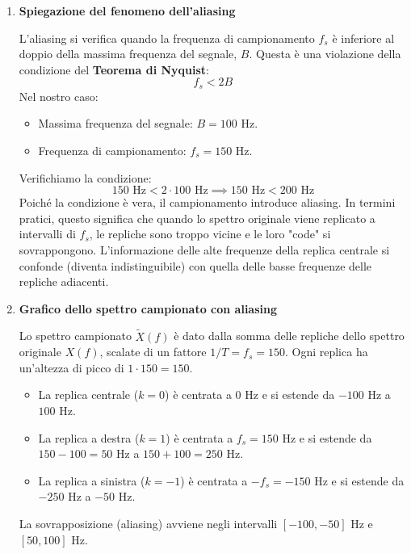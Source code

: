 
\begin{soluzione}{6}
    \begin{enumerate}
        \item \textbf{Spiegazione del fenomeno dell'aliasing}
        
        L'aliasing si verifica quando la frequenza di campionamento $f_s$ è inferiore al doppio della massima frequenza del segnale, $B$. Questa è una violazione della condizione del \textbf{Teorema di Nyquist}:
        \[
            f_s < 2B
        \]
        Nel nostro caso:
        \begin{itemize}
            \item Massima frequenza del segnale: $B = 100$ Hz.
            \item Frequenza di campionamento: $f_s = 150$ Hz.
        \end{itemize}
        Verifichiamo la condizione:
        \[
            150 \text{ Hz} < 2 \cdot 100 \text{ Hz} \implies 150 \text{ Hz} < 200 \text{ Hz}
        \]
        Poiché la condizione è vera, il campionamento introduce aliasing. In termini pratici, questo significa che quando lo spettro originale viene replicato a intervalli di $f_s$, le repliche sono troppo vicine e le loro "code" si sovrappongono. L'informazione delle alte frequenze della replica centrale si confonde (diventa indistinguibile) con quella delle basse frequenze delle repliche adiacenti.

        \item \textbf{Grafico dello spettro campionato con aliasing}

        Lo spettro campionato $\tilde{X}(f)$ è dato dalla somma delle repliche dello spettro originale $X(f)$, scalate di un fattore $1/T = f_s = 150$. Ogni replica ha un'altezza di picco di $1 \cdot 150 = 150$.
        \begin{itemize}
            \item La replica centrale ($k=0$) è centrata a $0$ Hz e si estende da $-100$ Hz a $100$ Hz.
            \item La replica a destra ($k=1$) è centrata a $f_s = 150$ Hz e si estende da $150-100 = 50$ Hz a $150+100=250$ Hz.
            \item La replica a sinistra ($k=-1$) è centrata a $-f_s = -150$ Hz e si estende da $-250$ Hz a $-50$ Hz.
        \end{itemize}
        La sovrapposizione (aliasing) avviene negli intervalli $[-100, -50]$ Hz e $[50, 100]$ Hz.


\end{enumerate}
\end{soluzione}
